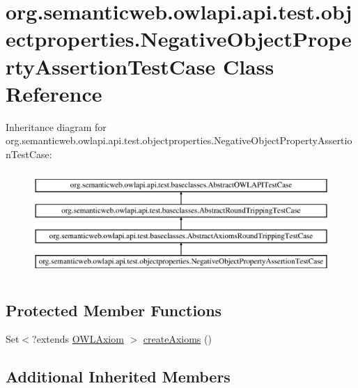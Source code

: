 \hypertarget{classorg_1_1semanticweb_1_1owlapi_1_1api_1_1test_1_1objectproperties_1_1_negative_object_property_assertion_test_case}{\section{org.\-semanticweb.\-owlapi.\-api.\-test.\-objectproperties.\-Negative\-Object\-Property\-Assertion\-Test\-Case Class Reference}
\label{classorg_1_1semanticweb_1_1owlapi_1_1api_1_1test_1_1objectproperties_1_1_negative_object_property_assertion_test_case}
}
Inheritance diagram for org.\-semanticweb.\-owlapi.\-api.\-test.\-objectproperties.\-Negative\-Object\-Property\-Assertion\-Test\-Case\-:\begin{figure}[H]
\begin{center}
\leavevmode
\includegraphics[height=4.000000cm]{classorg_1_1semanticweb_1_1owlapi_1_1api_1_1test_1_1objectproperties_1_1_negative_object_property_assertion_test_case}
\end{center}
\end{figure}
\subsection*{Protected Member Functions}
\begin{DoxyCompactItemize}
\item 
Set$<$?extends \hyperlink{interfaceorg_1_1semanticweb_1_1owlapi_1_1model_1_1_o_w_l_axiom}{O\-W\-L\-Axiom} $>$ \hyperlink{classorg_1_1semanticweb_1_1owlapi_1_1api_1_1test_1_1objectproperties_1_1_negative_object_property_assertion_test_case_aed3267479d16ae84d0f8a73faf336c2a}{create\-Axioms} ()
\end{DoxyCompactItemize}
\subsection*{Additional Inherited Members}


